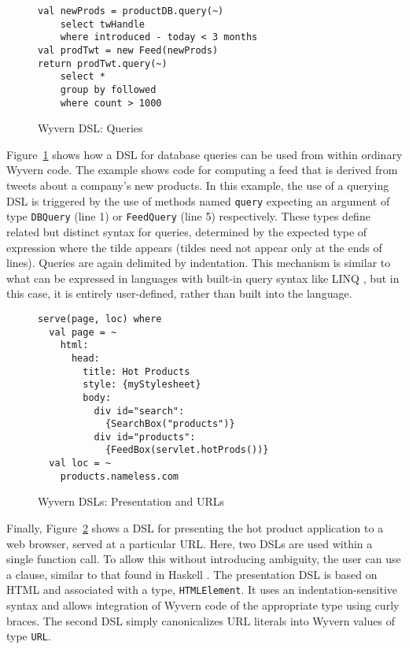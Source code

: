 \begin{figure}
  \centering
  \begin{lstlisting}
val newProds = productDB.query(~)
    select twHandle 
    where introduced - today < 3 months
val prodTwt = new Feed(newProds)
return prodTwt.query(~)
    select *
    group by followed
    where count > 1000
  \end{lstlisting}
  \caption{Wyvern DSL: Queries}
  \label{f:dsl-query}
\end{figure}

Figure~\ref{f:dsl-query} shows how a DSL for database queries can be used from within ordinary Wyvern code.  The example shows code for computing a feed that is derived from tweets about a company's new products.  In this example, the use of a querying DSL is triggered by the use of methods named \lstinline{query} expecting an argument of type \lstinline{DBQuery} (line 1) or \lstinline{FeedQuery} (line 5) respectively.  These types define related but distinct syntax for queries, determined by the expected type of expression where the tilde appears (tildes need not appear only at the ends of lines). Queries are again delimited by indentation. This mechanism is similar to what can be expressed in languages with built-in query syntax like LINQ \cite{mslinq}, but in this case, it is entirely user-defined, rather than built into the language.\begin{figure}
  \centering
  \begin{lstlisting}
serve(page, loc) where 
  val page = ~ 
    html:
      head:
        title: Hot Products
        style: {myStylesheet}
        body:
          div id="search":
            {SearchBox("products")}
          div id="products":
            {FeedBox(servlet.hotProds())}
  val loc = ~
    products.nameless.com
  \end{lstlisting}
  \caption{Wyvern DSLs: Presentation and URLs}
  \label{f:dsl-presentation}
\end{figure}

Finally, Figure~\ref{f:dsl-presentation} shows a DSL for presenting the hot product application to a web browser, served at a particular URL. Here, two DSLs are used within a single function call. To allow this without introducing ambiguity, the user can use a  clause, similar to that found in Haskell \cite{jones2003haskell}. The presentation DSL is based on HTML and associated with a type, \lstinline{HTMLElement}. It uses an indentation-sensitive syntax and allows integration of Wyvern code of the appropriate type using curly braces. The second DSL simply canonicalizes URL literals into Wyvern values of type \lstinline{URL}.
